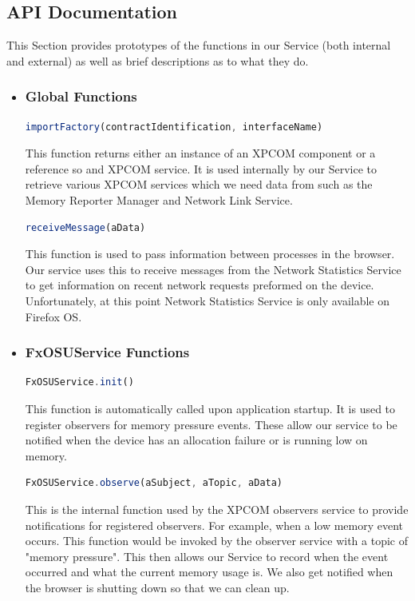 \documentclass[12pt]{article}
\begin{document}
\subsection{API Documentation}
This Section provides prototypes of the functions in our Service (both internal and external) as well as brief descriptions as to what they do.
\begin{itemize}
\item \subsubsection{Global Functions}
\begin{lstlisting}[language=JavaScript]
importFactory(contractIdentification, interfaceName)
\end{lstlisting}
This function returns either an instance of an XPCOM component or a reference so and XPCOM service.  It is used internally by our Service to retrieve various XPCOM services which we need data from such as the Memory Reporter Manager and Network Link Service.  \\ 
\begin{lstlisting}[language=JavaScript]
receiveMessage(aData)
\end{lstlisting}
This function is used to pass information between processes in the browser.  Our service uses this to receive messages from the Network Statistics Service to get information on recent network requests preformed on the device.  Unfortunately, at this point Network Statistics Service is only available on Firefox OS. 
\item \subsubsection{FxOSUService Functions}
\begin{lstlisting}[language=JavaScript]
FxOSUService.init()
\end{lstlisting}  
This function is automatically called upon application startup.  It is used to register observers for memory pressure events.  These allow our service to be notified when the device has an allocation failure or is running low on memory.  \\
\begin{lstlisting}[language=JavaScript]
FxOSUService.observe(aSubject, aTopic, aData)
\end{lstlisting} 
This is the internal function used by the XPCOM observers service to provide notifications for registered observers. For example, when a low memory event occurs.  This function would be invoked by the observer service with a topic of "memory pressure".  This then allows our Service to record when the event occurred and what the current memory usage is.  We also get notified when the browser is shutting down so that we can clean up. \\

\end{itemize}
\end{document}
